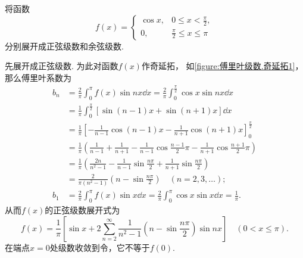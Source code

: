 \begin{example}
将函数\[
	f(x) = \left\{ \begin{array}{cc}
		\cos x, & 0 \leq x < \frac{\pi}{2}, \\
		0, & \frac{\pi}{2} \leq x \leq \pi
	\end{array} \right.
\]分别展开成正弦级数和余弦级数.
\begin{solution}
先展开成正弦级数.
为此对函数\(f(x)\)作奇延拓，
如\cref{figure:傅里叶级数.奇延拓1}，
那么傅里叶系数为\begin{align*}
	b_n &= \frac{2}{\pi} \int_0^{\pi} f(x) \sin nx \dd{x}
	= \frac{2}{\pi}
		\int_0^{\frac{\pi}{2}} \cos x \sin nx \dd{x} \\
	&= \frac{1}{\pi}
		\int_0^{\frac{\pi}{2}} [\sin(n-1)x + \sin(n+1)x] \dd{x} \\
	&= \frac{1}{\pi}
		\left[
			-\frac{1}{n-1} \cos(n-1)x - \frac{1}{n+1} \cos(n+1)x
		\right]_0^{\frac{\pi}{2}} \\
	&= \frac{1}{\pi}
		\left(
			\frac{1}{n-1}
			+ \frac{1}{n+1}
			- \frac{1}{n-1} \cos\frac{n-1}{2}\pi
			- \frac{1}{n+1} \cos\frac{n+1}{2}\pi
		\right) \\
	&= \frac{1}{\pi}
		\left(
			\frac{2n}{n^2-1}
			- \frac{1}{n-1}
			\sin\frac{n\pi}{2}
			+ \frac{1}{n+1}\sin\frac{n\pi}{2}
		\right) \\
	&= \frac{2}{\pi(n^2-1)} \left(n-\sin\frac{n\pi}{2}\right)
		\quad(n=2,3,\dotsc); \\
	b_1 &= \frac{2}{\pi} \int_0^{\pi} f(x) \sin x \dd{x}
	= \frac{2}{\pi} \int_0^{\pi} \cos x \sin x \dd{x} = \frac{1}{\pi}.
\end{align*}
从而\(f(x)\)的正弦级数展开式为\[
f(x) = \frac{1}{\pi} \left[
		\sin x
		+ 2\sum\limits_{n=2}^\infty
			\frac{1}{n^2-1} \left(n-\sin\frac{n\pi}{2}\right) \sin nx
	\right]
	\quad(0 < x \leq \pi).
\]
在端点\(x=0\)处级数收敛到令，它不等于\(f(0)\).


\end{solution}
\end{example}
